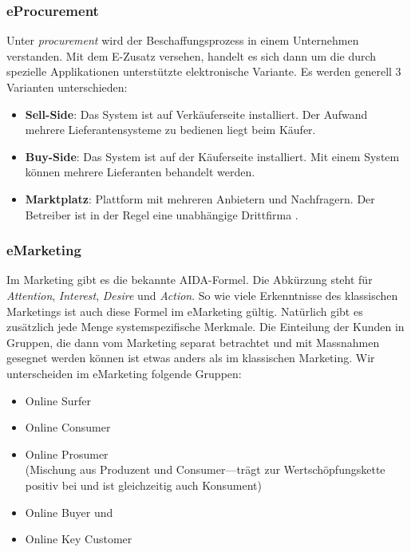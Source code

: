 \subsubsection*{eProcurement}

Unter \emph{procurement} wird der Beschaffungsprozess in einem Unternehmen
verstanden. Mit dem E-Zusatz versehen, handelt es sich dann um die durch
spezielle Applikationen unterstützte elektronische Variante. Es
werden generell 3 Varianten unterschieden:

\begin{itemize}
    \item\textbf{Sell-Side}: Das System ist auf Verkäuferseite installiert.
    Der Aufwand mehrere Lieferantensysteme zu bedienen liegt beim Käufer.
    \item\textbf{Buy-Side}: Das System ist auf der Käuferseite installiert.
    Mit einem System können mehrere Lieferanten behandelt werden.
    \item\textbf{Marktplatz}: Plattform mit mehreren Anbietern und Nachfragern.
    Der Betreiber ist in der Regel eine unabhängige Drittfirma .
\end{itemize}

\label{MMeP}

\subsubsection*{eMarketing}

Im Marketing gibt es die bekannte AIDA-Formel.
Die Abkürzung steht für
\emph{Attention}, \emph{Interest}, \emph{Desire} und \emph{Action}.
So wie viele Erkenntnisse des klassischen Marketings ist auch diese
Formel im eMarketing gültig. Natürlich gibt es zusätzlich jede Menge
systemspezifische Merkmale. Die Einteilung der Kunden in Gruppen,
die dann vom Marketing separat betrachtet und mit Massnahmen gesegnet
werden können ist etwas anders als im klassischen Marketing. Wir
unterscheiden im eMarketing folgende Gruppen:

\begin{itemize}
    \item Online Surfer
    \item Online Consumer
    \item Online Prosumer \\
    (Mischung aus Produzent und Consumer---trägt zur Wertschöpfungskette
    positiv bei und ist gleichzeitig auch Konsument)
    \item Online Buyer und
    \item Online Key Customer
\end{itemize}


